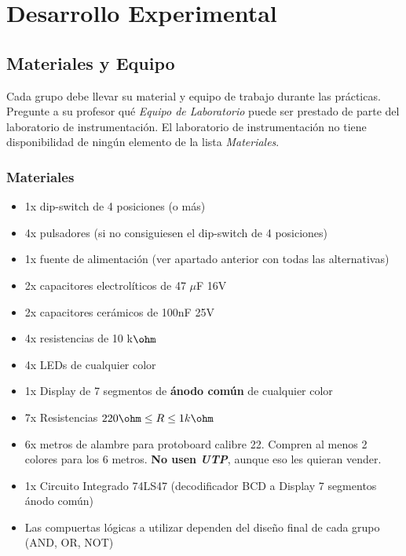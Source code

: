 \pagebreak

\section{Desarrollo Experimental}
\subsection{Materiales y Equipo}

Cada grupo debe llevar su material y equipo de trabajo durante las prácticas. Pregunte a su profesor qué \emph{Equipo de Laboratorio} puede ser prestado
de parte del laboratorio de instrumentación. El laboratorio de instrumentación no tiene disponibilidad de ningún elemento de la lista \emph{Materiales}.

\subsubsection*{Materiales}
\begin{itemize}
    \item 1x dip-switch de 4 posiciones (o más)
    \item 4x pulsadores (si no consiguiesen el dip-switch de 4 posiciones)
    \item 1x fuente de alimentación (ver apartado anterior con todas las alternativas)
    \item 2x capacitores electrolíticos de 47 $\mu$F 16V
    \item 2x capacitores cerámicos de 100nF 25V
    \item 4x resistencias de 10 k$\ohm$
    \item 4x LEDs de cualquier color
    \item 1x Display de 7 segmentos de \textbf{ánodo común} de cualquier color
    \item 7x Resistencias $220 \ohm \leq R \leq 1 k\ohm$
    \item 6x metros de alambre para protoboard calibre 22. Compren al menos 2 colores para los 6 metros. \textbf{No usen \emph{UTP}}, aunque eso les quieran vender.
    \item 1x Circuito Integrado 74LS47 (decodificador BCD a Display 7 segmentos ánodo común)
    \item Las compuertas lógicas a utilizar dependen del diseño final de cada grupo (AND, OR, NOT)
\end{itemize}


